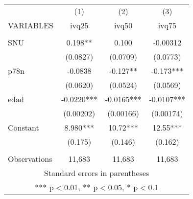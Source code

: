\begin{tabular}{lccc} \hline
 & (1) & (2) & (3) \\
VARIABLES & ivq25 & ivq50 & ivq75 \\ \hline
 &  &  &  \\
SNU & 0.198** & 0.100 & -0.00312 \\
 & (0.0827) & (0.0709) & (0.0773) \\
p78n & -0.0838 & -0.127** & -0.173*** \\
 & (0.0620) & (0.0524) & (0.0569) \\
edad & -0.0220*** & -0.0165*** & -0.0107*** \\
 & (0.00202) & (0.00166) & (0.00174) \\
Constant & 8.980*** & 10.72*** & 12.55*** \\
 & (0.175) & (0.146) & (0.162) \\
 &  &  &  \\
 Observations & 11,683 & 11,683 & 11,683 \\ \hline
\multicolumn{4}{c}{ Standard errors in parentheses} \\
\multicolumn{4}{c}{ *** p$<$0.01, ** p$<$0.05, * p$<$0.1} \\
\end{tabular}
